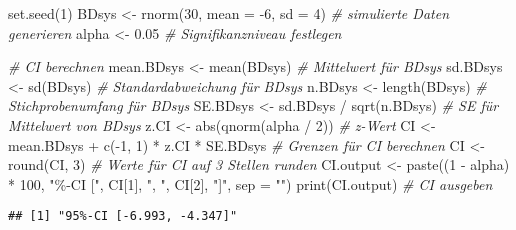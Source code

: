\documentclass[
]{book}
\newenvironment{Shaded}{\begin{snugshade}}{\end{snugshade}}
\newcommand{\AttributeTok}[1]{\textcolor[rgb]{0.77,0.63,0.00}{#1}}
\newcommand{\CommentTok}[1]{\textcolor[rgb]{0.56,0.35,0.01}{\textit{#1}}}
\newcommand{\DecValTok}[1]{\textcolor[rgb]{0.00,0.00,0.81}{#1}}
\newcommand{\FloatTok}[1]{\textcolor[rgb]{0.00,0.00,0.81}{#1}}
\newcommand{\FunctionTok}[1]{\textcolor[rgb]{0.00,0.00,0.00}{#1}}
\newcommand{\NormalTok}[1]{#1}
\newcommand{\OtherTok}[1]{\textcolor[rgb]{0.56,0.35,0.01}{#1}}
\newcommand{\SpecialCharTok}[1]{\textcolor[rgb]{0.00,0.00,0.00}{#1}}
\newcommand{\StringTok}[1]{\textcolor[rgb]{0.31,0.60,0.02}{#1}}
\begin{document}
\begin{Shaded}
\begin{Highlighting}[]
\FunctionTok{set.seed}\NormalTok{(}\DecValTok{1}\NormalTok{)}
\NormalTok{BDsys }\OtherTok{\textless{}{-}} \FunctionTok{rnorm}\NormalTok{(}\DecValTok{30}\NormalTok{, }\AttributeTok{mean =} \SpecialCharTok{{-}}\DecValTok{6}\NormalTok{, }\AttributeTok{sd =} \DecValTok{4}\NormalTok{)  }\CommentTok{\# simulierte Daten generieren  }
\NormalTok{alpha }\OtherTok{\textless{}{-}} \FloatTok{0.05}                          \CommentTok{\# Signifikanzniveau festlegen}

\CommentTok{\# CI berechnen  }
\NormalTok{mean.BDsys }\OtherTok{\textless{}{-}} \FunctionTok{mean}\NormalTok{(BDsys)              }\CommentTok{\# Mittelwert für BDsys}
\NormalTok{sd.BDsys }\OtherTok{\textless{}{-}} \FunctionTok{sd}\NormalTok{(BDsys)                  }\CommentTok{\# Standardabweichung für BDsys}
\NormalTok{n.BDsys }\OtherTok{\textless{}{-}} \FunctionTok{length}\NormalTok{(BDsys)               }\CommentTok{\# Stichprobenumfang für BDsys}
\NormalTok{SE.BDsys }\OtherTok{\textless{}{-}}\NormalTok{ sd.BDsys }\SpecialCharTok{/} \FunctionTok{sqrt}\NormalTok{(n.BDsys)   }\CommentTok{\# SE für Mittelwert von BDsys    }
\NormalTok{z.CI }\OtherTok{\textless{}{-}} \FunctionTok{abs}\NormalTok{(}\FunctionTok{qnorm}\NormalTok{(alpha }\SpecialCharTok{/} \DecValTok{2}\NormalTok{))          }\CommentTok{\# z{-}Wert}
\NormalTok{CI }\OtherTok{\textless{}{-}}\NormalTok{ mean.BDsys }\SpecialCharTok{+} \FunctionTok{c}\NormalTok{(}\SpecialCharTok{{-}}\DecValTok{1}\NormalTok{, }\DecValTok{1}\NormalTok{) }\SpecialCharTok{*}\NormalTok{ z.CI }\SpecialCharTok{*}\NormalTok{ SE.BDsys  }\CommentTok{\#  Grenzen für CI berechnen}
\NormalTok{CI }\OtherTok{\textless{}{-}} \FunctionTok{round}\NormalTok{(CI, }\DecValTok{3}\NormalTok{)                     }\CommentTok{\# Werte für CI auf 3 Stellen runden}
\NormalTok{CI.output }\OtherTok{\textless{}{-}} \FunctionTok{paste}\NormalTok{((}\DecValTok{1} \SpecialCharTok{{-}}\NormalTok{ alpha) }\SpecialCharTok{*} \DecValTok{100}\NormalTok{, }\StringTok{"\%{-}CI ["}\NormalTok{, CI[}\DecValTok{1}\NormalTok{], }\StringTok{", "}\NormalTok{, CI[}\DecValTok{2}\NormalTok{], }\StringTok{"]"}\NormalTok{, }\AttributeTok{sep =} \StringTok{""}\NormalTok{)}
\FunctionTok{print}\NormalTok{(CI.output)                       }\CommentTok{\# CI ausgeben}
\end{Highlighting}
\end{Shaded}

\begin{verbatim}
## [1] "95%-CI [-6.993, -4.347]"
\end{verbatim}
\end{document}
